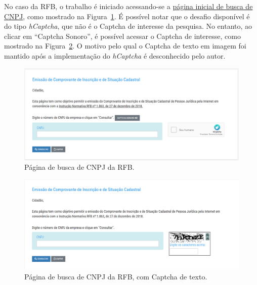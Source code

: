\documentclass[12pt,twoside,brazilian]{book}
\begin{document}
No caso da RFB, o trabalho é iniciado acessando-se a
\href{http://servicos.receita.fazenda.gov.br/Servicos/cnpjreva/Cnpjreva_Solicitacao.asp}{página
inicial de busca de CNPJ}, como mostrado na
Figura~\ref{fig-raspagem-rfb-inicial}. É possível notar que o desafio
disponível é do tipo \emph{hCaptcha}, que não é o Captcha de interesse
da pesquisa. No entanto, ao clicar em ``Captcha Sonoro'', é possível
acessar o Captcha de interesse, como mostrado na
Figura~\ref{fig-raspagem-rfb-sonoro}. O motivo pelo qual o Captcha de
texto em imagem foi mantido após a implementação do \emph{hCaptcha} é
desconhecido pelo autor.

\begin{figure}

{\centering \includegraphics{./assets/img/raspagem-rfb-inicial.png}

}

\caption{\label{fig-raspagem-rfb-inicial}Página de busca de CNPJ da
RFB.}

\end{figure}

\begin{figure}

{\centering \includegraphics{./assets/img/raspagem-rfb-sonoro.png}

}

\caption{\label{fig-raspagem-rfb-sonoro}Página de busca de CNPJ da RFB,
com Captcha de texto.}

\end{figure}
\end{document}
